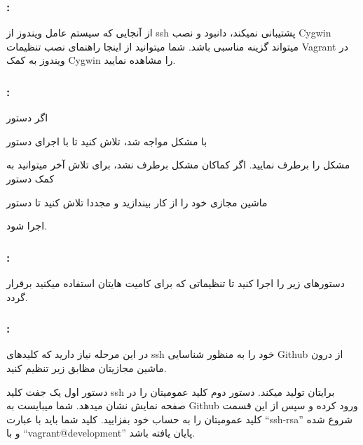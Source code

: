\subsubsection{
:
}
از آنجایی که سیستم عامل ویندوز از ssh پشتیبانی نمیکند، دانبود و نصب Cygwin میتواند گزینه مناسبی باشد. شما میتوانید از اینجا راهنمای نصب تنظیمات Vagrant در ویندوز به کمک Cygwin را مشاهده نمایید.

\subsubsection{
:
}
اگر دستور \begin{flushleft}
\end{flushleft} با مشکل مواجه شد، تلاش کنید تا با اجرای دستور \begin{flushleft}
\end{flushleft} مشکل را برطرف نمایید.
اگر کماکان مشکل برطرف نشد، برای تلاش آخر میتوانید به کمک دستور \begin{flushleft}
\end{flushleft} ماشین مجازی خود را از کار بیندازید و مجددا تلاش کنید تا دستور \begin{flushleft}
\end{flushleft} اجرا شود.

\subsubsection{
:
}
دستورهای زیر را اجرا کنید تا تنظیماتی که برای کامیت هایتان استفاده میکنید برقرار گردد.

\begin{flushleft}
\end{flushleft}

\subsubsection{
:
}
در این مرحله نیاز دارید که کلیدهای ssh خود را به منظور شناسایی Github از درون ماشین مجازیتان مظابق زیر تنظیم کنید.

\begin{flushleft}
\end{flushleft}

دستور اول یک جفت کلید ssh برایتان تولید میکند. دستور دوم کلید عمومیتان را در صفحه نمایش نشان میدهد. شما میبایست به Github ورود کرده و سپس از این قسمت کلید عمومیتان را به حساب خود بفزایید. کلید شما باید با عبارت “ssh-rsa” شروع شده و با “vagrant@development” پایان یافته باشد.

